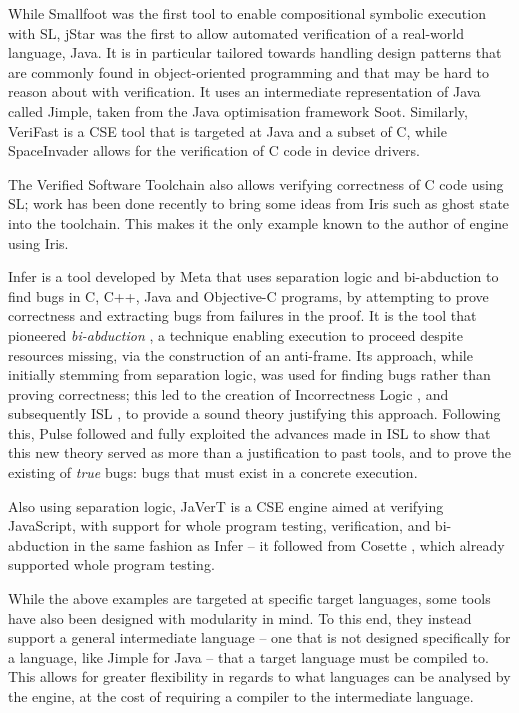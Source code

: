 While Smallfoot \cite{smallfoot} was the first tool to enable compositional symbolic execution with SL, jStar \cite{jstar} was the first to allow automated verification of a real-world language, Java. It is in particular tailored towards handling design patterns that are commonly found in object-oriented programming and that may be hard to reason about with verification. It uses an intermediate representation of Java called Jimple, taken from the Java optimisation framework Soot. Similarly, VeriFast \cite{verifast} is a CSE tool that is targeted at Java and a subset of C, while SpaceInvader \cite{spaceinvader} allows for the verification of C code in device drivers.

The Verified Software Toolchain \cite{vstiris} also allows verifying correctness of C code using SL; work has been done recently to bring some ideas from Iris such as ghost state into the toolchain. This makes it the only example known to the author of engine using Iris.

Infer \cite{infer} is a tool developed by Meta that uses separation logic and bi-abduction to find bugs in C, C++, Java and Objective-C programs, by attempting to prove correctness and extracting bugs from failures in the proof. It is the tool that pioneered \emph{bi-abduction} \cite{biabduction}, a technique enabling execution to proceed despite resources missing, via the construction of an anti-frame. Its approach, while initially stemming from separation logic, was used for finding bugs rather than proving correctness; this led to the creation of Incorrectness Logic \cite{incorrectnesslogic}, and subsequently ISL \cite{isl}, to provide a sound theory justifying this approach. Following this, Pulse \cite{pulse} followed and fully exploited the advances made in ISL to show that this new theory served as more than a justification to past tools, and to prove the existing of \emph{true} bugs: bugs that must exist in a concrete execution.

Also using separation logic, JaVerT \cite{javert1, javert2} is a CSE engine aimed at verifying JavaScript, with support for whole program testing, verification, and bi-abduction in the same fashion as Infer -- it followed from Cosette \cite{cosette}, which already supported whole program testing.

While the above examples are targeted at specific target languages, some tools have also been designed with modularity in mind. To this end, they instead support a general intermediate language -- one that is not designed specifically for a language, like Jimple for Java -- that a target language must be compiled to. This allows for greater flexibility in regards to what languages can be analysed by the engine, at the cost of requiring a compiler to the intermediate language.

